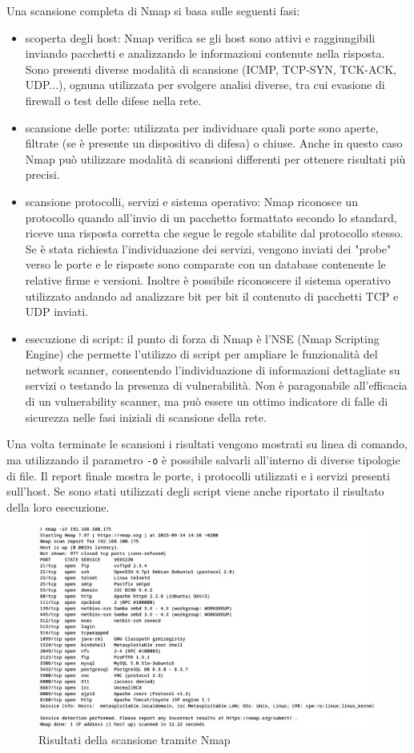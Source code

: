 \documentclass[12pt]{report}
\begin{document}
Una scansione completa di Nmap si basa sulle seguenti fasi:
\begin{itemize}
    \item scoperta degli host: Nmap verifica se gli host sono attivi e raggiungibili inviando pacchetti e analizzando le informazioni contenute nella risposta. Sono presenti diverse modalità di scansione (ICMP, TCP-SYN, TCK-ACK, UDP...), ognuna utilizzata per svolgere analisi diverse, tra cui evasione di firewall o test delle difese nella rete.
    \item scansione delle porte: utilizzata per individuare quali porte sono aperte, filtrate (se è presente un dispositivo di difesa) o chiuse. Anche in questo caso Nmap può utilizzare modalità di scansioni differenti per ottenere risultati più precisi.
    \item scansione protocolli, servizi e sistema operativo: Nmap riconosce un protocollo quando all'invio di un pacchetto formattato secondo lo standard, riceve una risposta corretta che segue le regole stabilite dal protocollo stesso. 
    Se è stata richiesta l'individuazione dei servizi, vengono inviati dei "probe" verso le porte e le risposte sono comparate con un database contenente le relative firme e versioni. 
    Inoltre è possibile riconoscere il sistema operativo utilizzato andando ad analizzare bit per bit il contenuto di pacchetti TCP e UDP inviati. 
    \item esecuzione di script: il punto di forza di Nmap è l'NSE (Nmap Scripting Engine) che permette l'utilizzo di script per ampliare le funzionalità del network scanner, consentendo l'individuazione di informazioni dettagliate su servizi o testando la presenza di vulnerabilità. Non è paragonabile all'efficacia di un vulnerability scanner, ma può essere un ottimo indicatore di falle di sicurezza nelle fasi iniziali di scansione della rete.
\end{itemize}

Una volta terminate le scansioni i risultati vengono mostrati su linea di comando, ma utilizzando il parametro \lstinline{-o} è possibile salvarli all'interno di diverse tipologie di file. Il report finale mostra le porte, i protocolli utilizzati e i servizi presenti sull'host. Se sono stati utilizzati degli script viene anche riportato il risultato della loro esecuzione.

\begin{figure}[htbp]
	\centering
	\includegraphics[width = 30em]{immagini/nmap_scan.png}
	\caption{Risultati della scansione tramite Nmap}
	\label{fig:metasploit}
\end{figure}
\end{document}
